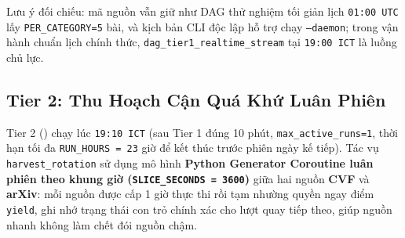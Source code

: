 Lưu ý đối chiếu: mã nguồn vẫn giữ  như DAG thử nghiệm tối giản lịch \texttt{01:00 UTC} lấy \texttt{PER\_CATEGORY=5} bài, và kịch bản CLI độc lập  hỗ trợ chạy \texttt{--daemon}; trong vận hành chuẩn lịch chính thức, \texttt{dag\_tier1\_realtime\_stream} tại \texttt{19:00 ICT} là luồng chủ lực.

\subsection{Tier 2: Thu Hoạch Cận Quá Khứ Luân Phiên}
\label{sec:ch2_tier2}

Tier 2 () chạy lúc \texttt{19:10 ICT} (sau Tier 1 đúng 10 phút, \texttt{max\_active\_runs=1}, thời hạn tối đa \texttt{RUN\_HOURS = 23} giờ để kết thúc trước phiên ngày kế tiếp). Tác vụ \texttt{harvest\_rotation} sử dụng mô hình \textbf{Python Generator Coroutine luân phiên theo khung giờ (\texttt{SLICE\_SECONDS = 3600})} giữa hai nguồn \textbf{CVF} và \textbf{arXiv}: mỗi nguồn được cấp 1 giờ thực thi rồi tạm nhường quyền ngay điểm \texttt{yield}, ghi nhớ trạng thái con trỏ chính xác cho lượt quay tiếp theo, giúp nguồn nhanh không làm chết đói nguồn chậm.

